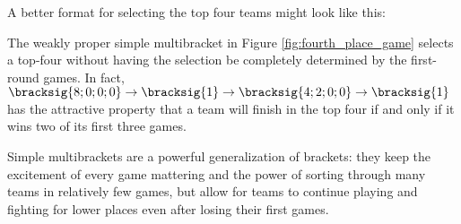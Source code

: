 {    A better format for selecting the top four teams might look like this:


    The weakly proper simple multibracket in Figure \ref{fig:fourth_place_game} selects a top-four without having the selection be completely determined by the first-round games. In fact, $\bracksig{8;0;0;0} \to \bracksig{1} \to \bracksig{4; 2; 0; 0} \to \bracksig{1}$ has the attractive property that a team will finish in the top four if and only if it wins two of its first three games.

    Simple multibrackets are a powerful generalization of brackets: they keep the excitement of every game mattering and the power of sorting through many teams in relatively few games, but allow for teams to continue playing and fighting for lower places even after losing their first games.
}